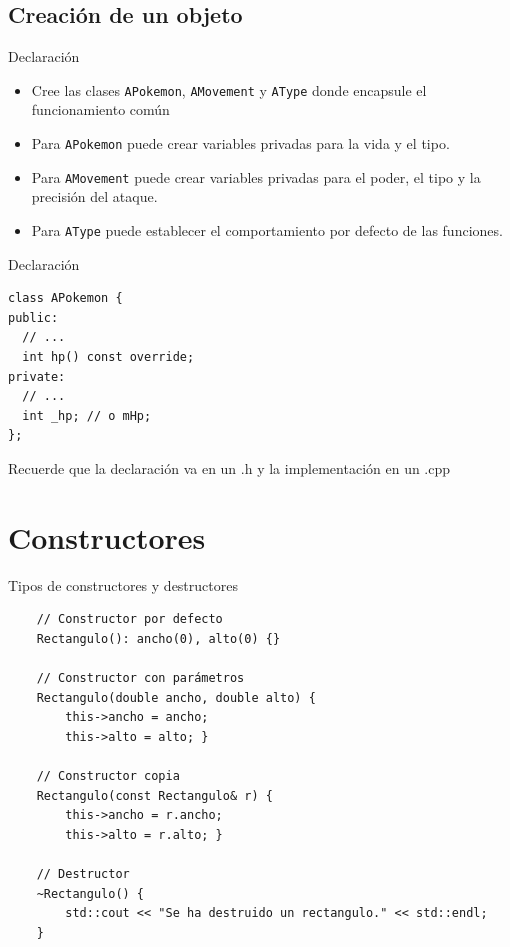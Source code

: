 \documentclass{beamer}
\begin{document}
\subsection{Creación de un objeto}

\begin{frame}[fragile]{Declaración}
\begin{itemize}
    \item Cree las clases \texttt{APokemon}, \texttt{AMovement} y \texttt{AType} donde encapsule el funcionamiento común
    \item Para \texttt{APokemon} puede crear variables privadas para la vida y el tipo.
    \item Para \texttt{AMovement} puede crear variables privadas para el poder, el tipo y la precisión del ataque.
    \item Para \texttt{AType} puede establecer el comportamiento por defecto de las funciones.
\end{itemize}
\end{frame}


\begin{frame}[fragile]{Declaración}
\begin{verbatim}
class APokemon {
public:
  // ...
  int hp() const override;
private:
  // ...
  int _hp; // o mHp;
};
\end{verbatim}
\begin{center}
    Recuerde que la declaración va en un .h y la implementación en un .cpp
\end{center}
\end{frame}

\section{Constructores}

\begin{frame}[fragile]{Tipos de constructores y destructores}

\begin{verbatim}
    // Constructor por defecto
    Rectangulo(): ancho(0), alto(0) {}

    // Constructor con parámetros
    Rectangulo(double ancho, double alto) {
        this->ancho = ancho; 
        this->alto = alto; }
        
    // Constructor copia
    Rectangulo(const Rectangulo& r) {
        this->ancho = r.ancho; 
        this->alto = r.alto; }
        
    // Destructor
    ~Rectangulo() {
        std::cout << "Se ha destruido un rectangulo." << std::endl;
    }    
\end{verbatim}
\end{frame}
\end{document}
